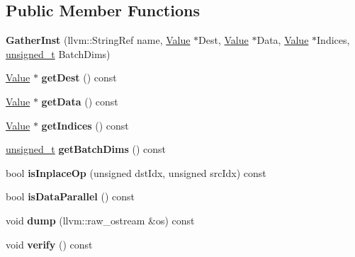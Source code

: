 \subsection*{Public Member Functions}
\begin{DoxyCompactItemize}
\item 
\mbox{\label{classglow_1_1_gather_inst_a570a0101bf67e97766d305001ea00ef8}} 
{\bfseries Gather\+Inst} (llvm\+::\+String\+Ref name, \hyperlink{classglow_1_1_value}{Value} $\ast$Dest, \hyperlink{classglow_1_1_value}{Value} $\ast$Data, \hyperlink{classglow_1_1_value}{Value} $\ast$Indices, \hyperlink{namespaceglow_a0ca574644e1e42ef193a9947fb4d8911}{unsigned\+\_\+t} Batch\+Dims)
\item 
\mbox{\label{classglow_1_1_gather_inst_acc2dd1e1b741ac32e67e826c66e4ccbd}} 
\hyperlink{classglow_1_1_value}{Value} $\ast$ {\bfseries get\+Dest} () const
\item 
\mbox{\label{classglow_1_1_gather_inst_a72eaeb3fc4e800ef76d95892fb2a8127}} 
\hyperlink{classglow_1_1_value}{Value} $\ast$ {\bfseries get\+Data} () const
\item 
\mbox{\label{classglow_1_1_gather_inst_a6d3ee6c750b5791655e1569801991a28}} 
\hyperlink{classglow_1_1_value}{Value} $\ast$ {\bfseries get\+Indices} () const
\item 
\mbox{\label{classglow_1_1_gather_inst_a542d4c3d48eb9fe4f134b53c5830577b}} 
\hyperlink{namespaceglow_a0ca574644e1e42ef193a9947fb4d8911}{unsigned\+\_\+t} {\bfseries get\+Batch\+Dims} () const
\item 
\mbox{\label{classglow_1_1_gather_inst_a1a70dbfce1b2d0ae9a29aeed60c39013}} 
bool {\bfseries is\+Inplace\+Op} (unsigned dst\+Idx, unsigned src\+Idx) const
\item 
\mbox{\label{classglow_1_1_gather_inst_a82cb5e3946d402b0b9bbf740bb303a1f}} 
bool {\bfseries is\+Data\+Parallel} () const
\item 
\mbox{\label{classglow_1_1_gather_inst_ab173615f939f0ad5a3ee48cecf193a2e}} 
void {\bfseries dump} (llvm\+::raw\+\_\+ostream \&os) const
\item 
\mbox{\label{classglow_1_1_gather_inst_aede12d1171cc6e4f8e71000dbdf5a434}} 
void {\bfseries verify} () const
\end{DoxyCompactItemize}
